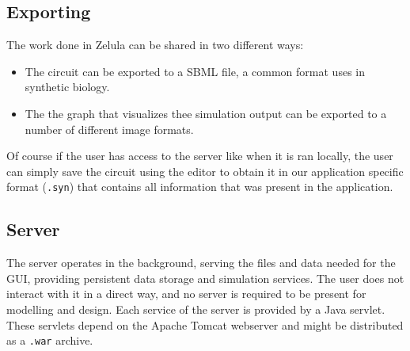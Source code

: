 \subsection{Exporting}
The work done in Zelula can be shared in two different ways:
\begin{itemize}
	\item The circuit can be exported to a SBML file, a common format uses in synthetic biology.
	\item The the graph that visualizes thee simulation output can be exported to a number of different image formats.
\end{itemize}



Of course if the user has access to the server like when it is ran locally, the user can simply save the circuit using the editor to obtain it in our application specific format (\verb=.syn=) that contains all information that was present in the application.

\subsection{Server}
The server operates in the background, serving the files and data needed for the GUI, providing persistent data storage and simulation services. The user does not interact with it in a direct way, and no server is required to be present for modelling and design. Each service of the server is provided by a Java servlet. These servlets depend on the Apache Tomcat webserver and might be distributed as a \verb|.war| archive. 
